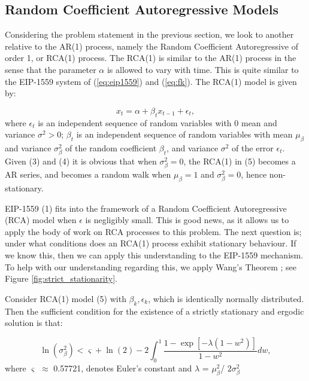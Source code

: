 \documentclass[futureinternet,article,submit,moreauthors,dvi2pdf]{mdpi}
\begin{document}
\subsection{Random Coefficient Autoregressive Models}
\label{section:rca}

Considering the problem statement in the previous section, we look to another relative to the AR(1) process, namely the Random Coefficient Autoregressive of order 1, or RCA(1) process. The RCA(1) is similar to the AR(1) process in the sense that the parameter $\alpha$ is allowed to vary with time. This is quite similar to the EIP-1559 system of (\ref{eq:eip1559}) and (\ref{eq:fk}). The RCA(1) model is given by:

\begin{equation}
x_{t} = \alpha + \beta_{t}x_{t-1} + \epsilon_{t},
\label{eq:rca1}
\end{equation}
where ${\epsilon_{t}}$ is an independent sequence of random variables with 0 mean and variance $\sigma^2 > 0$; ${\beta_{t}}$ is an independent sequence of random variables with mean $\mu_{\beta}$ and variance $\sigma_{\beta}^2$ of the random coefficient $\beta_{t}$, and variance $\sigma^2$ of the error $\epsilon_{t}$. Given (3) and (4) it is obvious that when $\sigma_{\beta}^2 = 0$, the RCA(1) in (5) becomes a AR series, and becomes a random walk when $\mu_{\beta} = 1$ and $\sigma_{\beta}^2 = 0$, hence non-stationary. 

EIP-1559 (1) fits into the framework of a Random Coefficient Autoregressive (RCA) model when $\epsilon$ is negligibly small. This is good news, as it allows us to apply the body of work on RCA processes to this problem. The next question is; under what conditions does an RCA(1) process exhibit stationary behaviour. If we know this, then we can apply this understanding to the EIP-1559 mechanism. To help with our understanding regarding this, we apply Wang's Theorem \cite{Wan03}; see Figure \ref{fig:strict_stationarity}.

\begin{Theorem}
Consider RCA(1) model (5) with ${\beta_{k},\epsilon_{k}}$, which is identically normally distributed.  Then the sufficient condition for the existence of a strictly stationary and ergodic solution is that:

\begin{equation}
\ln(\sigma_{\beta}^2) < \varsigma + \ln(2) - 2 \int_{0}^{1}\frac{1 - \exp[-\lambda(1-w^2)]}{1-w^2}dw,
\label{eq:thm} 
\end{equation}
where $\varsigma$ $\approx$ 0.57721, denotes Euler’s constant and $\lambda$ = $\mu_{\beta}^2$/ $2\sigma_{\beta}^2$
\end{Theorem}
\end{document}
